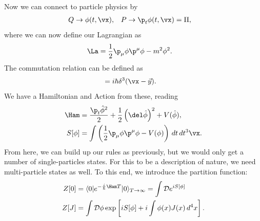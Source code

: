 \documentclass[relqm.tex]{subfiles}
\begin{document}
Now we can connect to particle physics by
\begin{align}
    Q &\to \phi(t,\vx), & P &\to \p_t\phi(t,\vx) = \Pi, 
\end{align}
where we can now define our Lagrangian as
\begin{align}
    \La &= \frac12 \p_\mu\phi\p^\mu\phi - m^2\phi^2. 
\end{align}
The commutation relation can be defined as
\begin{align}
    [\hat{\phi}(\vx),\hat{\Pi}(\vec{y})] &= i\hbar\delta^3(\vx-\vec{y}).
\end{align}
We have a Hamiltonian and Action from these, reading
\begin{align}
    \Ham &= \frac{\p_t\hat{\phi}^2}{2} + \frac12\left(\del\hat{\phi}\right)^2+V(\hat{\phi}), \\
    S[\phi] &= \int \left(\frac12\p_\mu\phi\p^\mu\phi - V(\phi)\right)\,dt\,dt^3\vx.
\end{align}
From here, we can build up our rules as previously, but we would only get a number of single-particles states. 
For this to be a description of nature, we need multi-particle states as well. 
To this end, we introduce the partition function:
\begin{align}
    Z[0] &= \langle0|e^{-\frac{i}{\hbar}\Ham T}|0\rangle_{T\to\infty} = \int\mathcal{D}e^{iS[\phi]}\\
    Z[J] &= \int \mathcal{D}\phi\exp\left[iS[\phi]+i\int\phi(x)J(x)\,d^4x\right].
\end{align}
\end{document}
